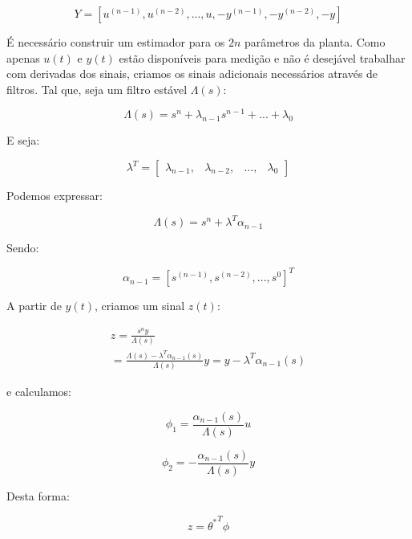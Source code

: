 \documentclass[conference,harvard,brazil,english]{sbatex}
\begin{document}
\begin{equation*}
Y = [u^{(n-1)},u^{(n-2)},...,u,-y^{(n-1)},-y^{(n-2)},-y]
\end{equation*}

É necessário construir um estimador para os $2n$ parâmetros da planta. Como apenas $u(t)$ e $y(t)$ estão disponíveis para medição e não é desejável trabalhar com derivadas dos sinais, criamos os sinais adicionais necessários através de filtros. Tal que, seja um filtro estável $\Lambda(s)$:

\begin{equation}
\Lambda(s) = s^n + \lambda_{n-1} s^{n-1} + ... + \lambda_0
\end{equation}

E seja:

\[ \lambda^T = \begin{bmatrix}
            \lambda_{n-1}, & \lambda_{n-2}, & ..., & \lambda_0
          \end{bmatrix}
\]

Podemos expressar:

\begin{equation}
\Lambda(s) = s^n + \lambda^T\alpha_{n-1}
\end{equation}

Sendo:

\begin{equation*}
\alpha_{n-1} = [s^{(n-1)},s^{(n-2)},...,s^0]^T
\end{equation*}

A partir de $y(t)$, criamos um sinal $z(t)$: 

\begin{equation}
\begin{array}{l}
z = \frac{s^n y}{\Lambda(s)} \\
= \frac{\Lambda(s) - \lambda^T\alpha_{n-1}(s)}{\Lambda(s)}y = y - \lambda^T\alpha_{n-1}(s)
\end{array}
\end{equation}

e calculamos:

\begin{equation}
\phi_1 = \frac{\alpha_{n-1}(s)}{\Lambda(s)} u
\end{equation}

\begin{equation}
\phi_2 = -\frac{\alpha_{n-1}(s)}{\Lambda(s)} y
\end{equation}

Desta forma:

\begin{equation}
z = {\theta^*}^T \phi
\end{equation}
\end{document}
